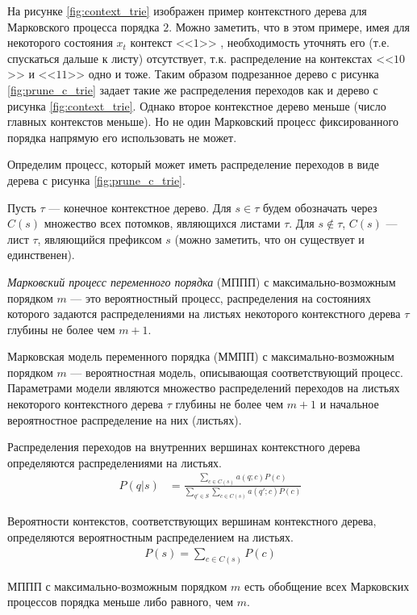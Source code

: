 \documentclass{matmex-diploma-custom}
\begin{document}
На рисунке \ref{fig:context_trie} изображен пример контекстного дерева для Марковского процесса порядка $ 2 $.
Можно заметить, что в этом примере, имея для некоторого состояния $x_{t}$ контекст  <<$1$>> , необходимость уточнять его (т.е. спускаться дальше к листу) отсутствует, т.к. распределение на контекстах  <<$10$>>  и  <<$11$>>  одно и тоже. 
Таким образом подрезанное дерево с рисунка \ref{fig:prune_c_trie} задает такие же распределения переходов как и дерево с рисунка \ref{fig:context_trie}. 
Однако второе контекстное дерево меньше (число главных контекстов меньше).
Но не один Марковский процесс фиксированного порядка напрямую его использовать не может.

Определим процесс, который может иметь распределение переходов в виде дерева с рисунка \ref{fig:prune_c_trie}.

Пусть $\tau$ --- конечное контекстное дерево.
Для $s \in \tau$ будем обозначать через $ C(s) $ множество всех потомков, являющихся листами $\tau$. 
Для $s \notin \tau$, $C(s)$ --- лист $\tau$, являющийся префиксом  $s$ (можно заметить, что он существует и единственен).
\begin{definition}
\textit{Марковский процесс переменного порядка} (МППП) с максимально-возможным порядком $m$ --- это вероятностный процесс, распределения на состояниях которого задаются распределениями на листьях некоторого контекстного дерева $\tau$ глубины не более чем $m+1$.
\label{def:c_trie}
\end{definition}

\begin{definition}
Марковская модель переменного порядка (ММПП) с максимально-возможным порядком $m$ --- вероятностная модель, описывающая соответствующий процесс.
Параметрами модели являются множество распределений переходов на листьях некоторого контекстного дерева $\tau$ глубины не более чем $m+1$ и начальное вероятностное распределение на них (листьях).
\end{definition}

\begin{remark}
Распределения переходов на внутренних вершинах контекстного дерева определяются распределениями на листьях.
\begin{align}
P(q| s) &= \frac{\sum_{c \in C(s)} {a(q; c)P(c)}}{\sum_{q' \in S}\sum_{c \in C(s)} {a(q';c)P(c)}}
\label{formula:ap_p}
\end{align}
\end{remark}
\begin{remark}
Вероятности контекстов, соответствующих вершинам контекстного дерева, определяются вероятностным распределением на листьях.
\begin{align}
P(s) = \sum_{c \in C(s)}{P(c)}
\label{formula:p}
\end{align}
\end{remark}
\begin{remark}
МППП с максимально-возможным порядком $m$ есть обобщение всех Марковских процессов порядка меньше либо равного, чем $ m $.
\end{remark}
\end{document}
